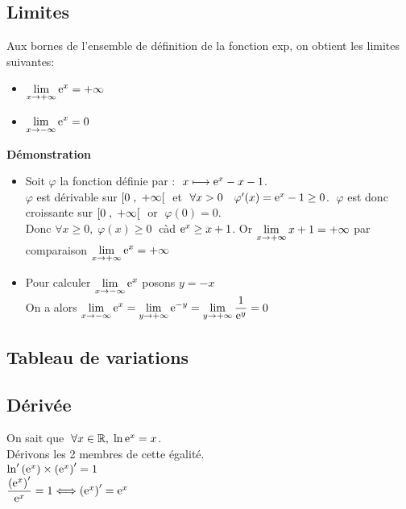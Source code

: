 \subsection*{Limites} 
Aux bornes de l'ensemble de définition de la fonction exp, on obtient les limites suivantes:
\begin{property}
\begin{itemize}
\item  $\displaystyle \lim_{x \to +\infty}\mathrm{e}^{x} =+\infty $ 
 \item $ \displaystyle\lim_{x \to -\infty}\mathrm{e}^{ x}=0 $
\end{itemize}
\end{property}

\textbf{Démonstration}
\begin{itemize}
\item  Soit $ \varphi $  la fonction définie par : $\; x\longmapsto \mathrm{e}^{x}-x-1 $. \\
$ \varphi $  est dérivable sur $ \left[0 \;,\; +\infty\right[ \;$    et  $ \;\forall x> 0 \quad  \varphi^{\prime}(x)= \mathrm{e}^{x}-1\geq 0$.  $ \;\varphi $  est donc croissante sur  $ \left[0 \;,\; +\infty\right[ \;$    or  $ \;\varphi(0)=0. $  \\ Donc $ \forall x \geq 0,\; \varphi(x)\geq 0 \;$  càd  $ \mathrm{e}^{x}\geq x+1 $.  Or $ \displaystyle\lim_{x \to +\infty}x+1=+\infty $  
par comparaison  $ \displaystyle\lim_{x \to +\infty}\mathrm{e}^{x} =+\infty $ \\
\item Pour calculer $ \displaystyle\lim_{x \to -\infty}\mathrm{e}^{ x} $\;  posons\; $ y=-x $   \\
On a alors \;$\displaystyle\lim_{x \to -\infty}\mathrm{e}^{ x} = \displaystyle\lim_{y \to +\infty}\mathrm{e}^{-y}=\lim_{y \to +\infty}\dfrac{1}{\mathrm{e}^{y}}=0 $

\end{itemize}
\subsection*{ Tableau de variations}
\begin{center}
\end{center}

\subsection*{Dérivée} 
On sait que  $\; \forall x \in \mathbb{R} ,\;  \ln{\mathrm{e}^{x}}=x $. \\
Dérivons les 2 membres de cette égalité.  \\
$ \ln^{\prime}\left( \mathrm{e}^{x}\right)\times \left(\mathrm{e}^{x}\right)^{\prime}=1$ \\
$ \dfrac{\left(\mathrm{e}^{x}\right)^{\prime}}{\mathrm{e}^{x}}=1   \Longleftrightarrow  \left(\mathrm{e}^{x}\right)^{\prime}=\mathrm{e}^{x}$ 

